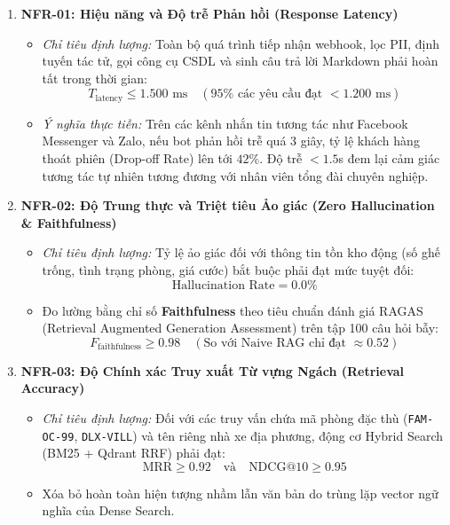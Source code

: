 \begin{enumerate}
    \item \textbf{NFR-01: Hiệu năng và Độ trễ Phản hồi (Response Latency)}
    \begin{itemize}
        \item \textit{Chỉ tiêu định lượng:} Toàn bộ quá trình tiếp nhận webhook, lọc PII, định tuyến tác tử, gọi công cụ CSDL và sinh câu trả lời Markdown phải hoàn tất trong thời gian:
        \begin{equation}
        T_{\text{latency}} \le 1.500\text{ ms} \quad (95\%\text{ các yêu cầu đạt } < 1.200\text{ ms})
        \end{equation}
        \item \textit{Ý nghĩa thực tiễn:} Trên các kênh nhắn tin tương tác như Facebook Messenger và Zalo, nếu bot phản hồi trễ quá 3 giây, tỷ lệ khách hàng thoát phiên (Drop-off Rate) lên tới $42\%$. Độ trễ $< 1.5$s đem lại cảm giác tương tác tự nhiên tương đương với nhân viên tổng đài chuyên nghiệp.
    \end{itemize}

    \item \textbf{NFR-02: Độ Trung thực và Triệt tiêu Ảo giác (Zero Hallucination \& Faithfulness)}
    \begin{itemize}
        \item \textit{Chỉ tiêu định lượng:} Tỷ lệ ảo giác đối với thông tin tồn kho động (số ghế trống, tình trạng phòng, giá cước) bắt buộc phải đạt mức tuyệt đối:
        \begin{equation}
        \text{Hallucination Rate} = 0.0\%
        \end{equation}
        \item Đo lường bằng chỉ số \textbf{Faithfulness} theo tiêu chuẩn đánh giá RAGAS (Retrieval Augmented Generation Assessment) trên tập 100 câu hỏi bẫy:
        \begin{equation}
        F_{\text{faithfulness}} \ge 0.98 \quad (\text{So với Naive RAG chỉ đạt } \approx 0.52)
        \end{equation}
    \end{itemize}

    \item \textbf{NFR-03: Độ Chính xác Truy xuất Từ vựng Ngách (Retrieval Accuracy)}
    \begin{itemize}
        \item \textit{Chỉ tiêu định lượng:} Đối với các truy vấn chứa mã phòng đặc thù (\texttt{FAM-OC-99}, \texttt{DLX-VILL}) và tên riêng nhà xe địa phương, động cơ Hybrid Search (BM25 + Qdrant RRF) phải đạt:
        \begin{equation}
        \text{MRR} \ge 0.92 \quad \text{và} \quad \text{NDCG@10} \ge 0.95
        \end{equation}
        \item Xóa bỏ hoàn toàn hiện tượng nhầm lẫn văn bản do trùng lặp vector ngữ nghĩa của Dense Search.
    \end{itemize}


\end{enumerate}
